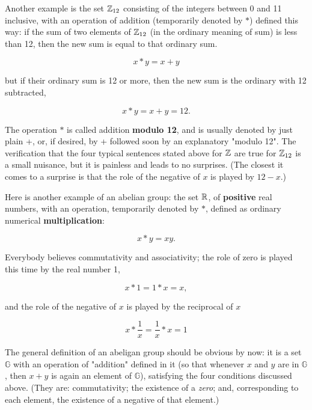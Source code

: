 Another example is the set $\mathbb{Z}_{12}$ consisting of the integers between 0 and 11 inclusive, with an operation of addition (temporarily denoted by $\ast$) defined this way: if the sum of two elements of $\mathbb{Z}_{12}$ (in the ordinary meaning of sum) is less than 12, then the new sum is equal to that ordinary sum.

\begin{equation}
    x \ast y = x + y
\end{equation}

but if their ordinary sum is 12 or more, then the new sum is the ordinary with 12 subtracted,

\begin{equation}
    x \ast y = x + y = 12.
\end{equation}

The operation $\ast$ is called addition \textbf{modulo 12}, and is usually denoted by just plain +, or, if desired, by + followed soon by an explanatory "modulo 12". The verification that the four typical sentences stated above for $\mathbb{Z}$ are true for $\mathbb{Z}_{12}$ is a small nuisance, but it is painless and leads to no surprises. (The closest it comes to a surprise is that the role of the negative of $x$ is played by $12-x$.)

Here is another example of an abelian group: the set $\mathbb{R}$, of \textbf{positive} real numbers, with an operation, temporarily denoted by $\ast$, defined as ordinary numerical \textbf{multiplication}:

\begin{equation}
    x \ast y = xy.
\end{equation}

Everybody believes commutativity and associativity; the role of zero is played this time by the real number 1,

\begin{equation}
    x \ast 1 = 1 \ast x = x,
\end{equation}

and the role of the negative of $x$ is played by the reciprocal of $x$

\begin{equation}
    x \ast \frac{1}{x} = \frac{1}{x} \ast x = 1
\end{equation}

The general definition of an abeligan group should be obvious by now: it is a set $\mathbb{G}$ with an operation of "addition" defined in it (so that whenever $x$ and $y$ are in $\mathbb{G}$, then $x+y$ is again an element of $\mathbb{G}$), satisfying the four conditions discussed above. (They are: commutativity; the existence of a \textit{zero}; and, corresponding to each element, the existence of a negative of that element.)

